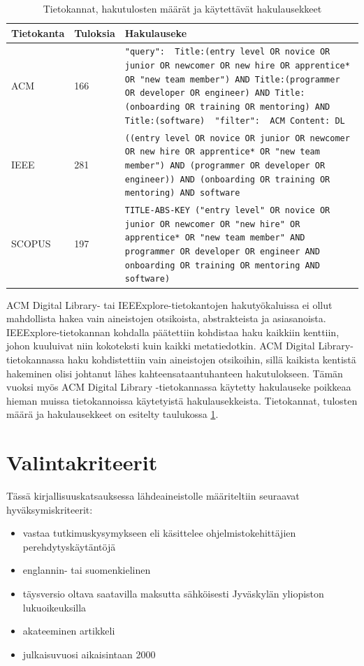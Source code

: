 \documentclass[utf8]{gradu3}
\begin{document}
\begin{table}[h]
    \footnotesize
    \begin{tabular}{llp{}}
        \toprule
        {Tietokanta} & Tuloksia & Hakulauseke \\
        \midrule
        ACM & 166 & {\tt "query": { Title:(entry level OR novice OR junior OR newcomer OR new hire OR apprentice* OR "new team member") AND Title:(programmer OR developer OR engineer) AND Title:(onboarding OR training OR mentoring) AND Title:(software) } "filter": { ACM Content: DL }  } \\
        \midrule
        IEEE & 281 & {\tt ((entry level OR novice OR junior OR newcomer OR new hire OR apprentice* OR "new team member") AND (programmer OR  developer OR engineer)) AND (onboarding OR training OR mentoring) AND software } \\
        \midrule
        SCOPUS & 197 & {\tt TITLE-ABS-KEY ("entry level"  OR  novice  OR  junior  OR  newcomer OR "new hire"  OR  apprentice* OR "new team member"  AND  programmer  OR  developer  OR  engineer  AND  onboarding  OR  training  OR  mentoring  AND  software)  } \\
        \bottomrule
    \end{tabular}  
    \caption{Tietokannat, hakutulosten määrät ja käytettävät hakulausekkeet}
    \label{tbl:tietokannat}
\end{table}

ACM Digital Library- tai IEEExplore-tietokantojen hakutyökaluissa ei ollut mahdollista hakea vain aineistojen otsikoista, abstrakteista ja asiasanoista. IEEExplore-tietokannan kohdalla päätettiin kohdistaa haku kaikkiin kenttiin, johon kuuluivat niin kokoteksti kuin kaikki metatiedotkin. ACM Digital Library-tietokannassa haku kohdistettiin vain aineistojen otsikoihin, sillä kaikista kentistä hakeminen olisi johtanut lähes kahteensataantuhanteen hakutulokseen. Tämän vuoksi myös ACM Digital Library -tietokannassa käytetty hakulauseke poikkeaa hieman muissa tietokannoissa käytetyistä hakulausekkeista. Tietokannat, tulosten määrä ja hakulausekkeet on esitelty taulukossa \ref{tbl:tietokannat}.

\section{Valintakriteerit}

Tässä kirjallisuuskatsauksessa lähdeaineistolle määriteltiin seuraavat hyväksymiskriteerit:

\begin{itemize}
    \item vastaa tutkimuskysymykseen eli käsittelee ohjelmistokehittäjien perehdytyskäytäntöjä
    \item englannin- tai suomenkielinen
    \item täysversio oltava saatavilla maksutta sähköisesti Jyväskylän yliopiston lukuoikeuksilla
    \item akateeminen artikkeli
    \item julkaisuvuosi aikaisintaan 2000
\end{itemize}
\end{document}
